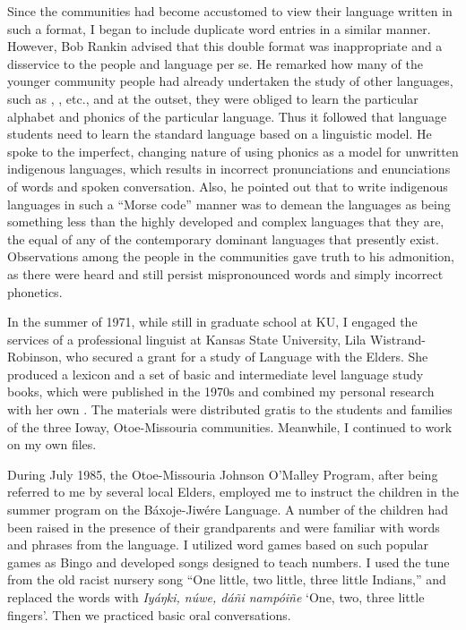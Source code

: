 \documentclass[output=paper]{LSP/langsci}
\begin{document}
Since the communities had become accustomed to view their language written in such a format, I began to include duplicate  word entries in a similar manner. However, Bob Rankin advised that this double format was inappropriate and a disservice to the people and language per se. He remarked how many of the younger community people had already undertaken the study of other languages, such as , , etc., and at the outset, they were obliged to learn the particular alphabet and phonics of the particular language. Thus it followed that language students need to learn the standard language  based on a linguistic model. He spoke to the imperfect, changing nature of using  phonics as a model for unwritten indigenous languages, which results in incorrect pronunciations and enunciations of words and spoken conversation. Also, he pointed out that to write indigenous languages in such a ``Morse code'' manner was to demean the languages as being something less than the highly developed and complex languages that they are, the equal of any of the contemporary dominant languages that presently exist. Observations among the people in the communities gave truth to his admonition, as there were heard and still persist mispronounced words and simply incorrect phonetics. 

In the summer of 1971, while still in graduate school at KU, I engaged the services of a professional linguist at Kansas State University, Lila Wistrand-Robin\-son, who secured a grant for a study of  Language with the Elders. She produced a lexicon and a set of basic and intermediate level language study books, which were published in the 1970s and combined my personal research with her own \citep{OtoeIowaWistrandRobinson1977,OtoeIowaWistrandRobinson1978}. The materials were distributed gratis to the students and families of the three Ioway, Otoe-Missouria communities. Meanwhile, I continued to work on my own  files.  

During July 1985, the Otoe-Missouria Johnson O'Malley Program, after being referred to me by several local Elders, employed me to instruct the children in the summer program on the Báxoje-Jiwére Language. A number of the children had been raised in the presence of their grandparents and were familiar with words and phrases from the language. I utilized word games based on such popular games as Bingo and developed songs designed to teach numbers. I used the tune from the old racist nursery song ``One little, two little, three little Indians,'' and replaced the words with \emph{Iyáŋki, núwe, dáñi nampóiñe} `One, two, three little fingers'. Then we practiced basic oral conversations.  
\end{document}

